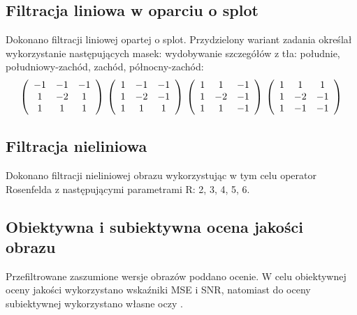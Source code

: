 \documentclass{classrep}
\begin{document}
\subsection{Filtracja liniowa w oparciu o splot}
\label{sec.tests.convolution}
Dokonano filtracji liniowej opartej o splot. Przydzielony wariant zadania określał wykorzystanie następujących masek: wydobywanie szczegółów z tła: południe, południowy-zachód, zachód, północny-zachód:
\begin{equation*}
\left(\begin{array}{ccc} -1 & -1 & -1 \\
1 & -2 & 1 \\
1 & 1 & 1 \\
\end{array}\right)\\
\\
\left(\begin{array}{ccc} 1 & -1 & -1 \\
1 & -2 & -1 \\
1 & 1 & 1 \\
\end{array}\right)\\
\\
\left(\begin{array}{ccc} 1 & 1 & -1 \\
1 & -2 & -1 \\
1 & 1 & -1 \\
\end{array}\right)\\
\\
\left(\begin{array}{ccc} 1 & 1 & 1 \\
1 & -2 & -1 \\
1 & -1 & -1 \\
\end{array}\right)
\end{equation*}

\subsection{Filtracja nieliniowa}
\label{sec.tests.filtering.nonlinear}
Dokonano filtracji nieliniowej obrazu wykorzystując w tym celu operator Rosenfelda z następującymi parametrami R: 2, 3, 4, 5, 6.

\subsection{Obiektywna i subiektywna ocena jakości obrazu}
\label{sec.tests.quality}
Przefiltrowane zaszumione wersje obrazów poddano ocenie. W celu obiektywnej oceny jakości wykorzystano wskaźniki MSE i SNR, natomiast do oceny subiektywnej wykorzystano własne oczy \smiley.
\end{document}
